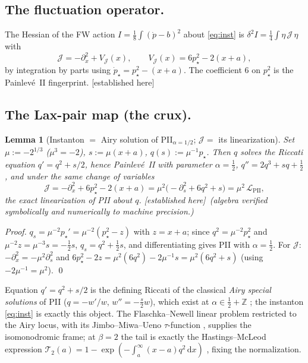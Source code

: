 \documentclass[11pt,reqno]{amsart}
\theoremstyle{plain}
\newtheorem{lemma}[theorem]{Lemma}
\theoremstyle{definition}
\theoremstyle{remark}
\newcommand{\dd}{\,\mathrm{d}}
\newcommand{\Z}{\mathbb{Z}}
\newcommand{\pinst}{p_\star}
\newcommand{\tagPr}{{\footnotesize\textsf{[established here]}}}
\begin{document}
\subsection{The fluctuation operator.}
The Hessian of the FW action $I=\tfrac18\int(\dot p-b)^2$ about \eqref{eq:inst} is
$\delta^2 I=\tfrac14\int\eta\,\mathcal J\,\eta$ with
\begin{equation}\label{eq:jacobi}
\mathcal J=-\partial_x^2+V_{\mathcal J}(x),\qquad V_{\mathcal J}(x)=6\pinst^2-2(x+a),
\end{equation}
by integration by parts using $\dot\pinst=\pinst^2-(x+a)$. The coefficient $6$ on $\pinst^2$ is the
Painlev\'e~II fingerprint. \tagPr

\subsection{The Lax-pair map (the crux).}
\begin{lemma}[Instanton $=$ Airy solution of PII${}_{\alpha=1/2}$; $\mathcal J=$ its linearization]
\label{lem:lax}
Set $\mu:=-2^{1/3}$ ($\mu^3=-2$), $s:=\mu(x+a)$, $q(s):=\mu^{-1}\pinst$. Then $q$ solves the Riccati
equation $q'=q^2+s/2$, hence Painlev\'e~II with parameter $\alpha=\tfrac12$, $q''=2q^3+sq+\tfrac12$,
and under the same change of variables
\[
\mathcal J=-\partial_x^2+6\pinst^2-2(x+a)=\mu^2\bigl(-\partial_s^2+6q^2+s\bigr)=\mu^2\,\mathcal L_{\mathrm{PII}},
\]
the exact linearization of PII about $q$. \tagPr\ \emph{(algebra verified symbolically and numerically
to machine precision.)}
\end{lemma}
\begin{proof}
$q_s=\mu^{-2}\pinst'=\mu^{-2}(\pinst^2-z)$ with $z=x+a$; since $q^2=\mu^{-2}\pinst^2$ and
$\mu^{-2}z=\mu^{-3}s=-\tfrac12 s$, $q_s=q^2+\tfrac12 s$, and differentiating gives PII with
$\alpha=\tfrac12$. For $\mathcal J$: $-\partial_x^2=-\mu^2\partial_s^2$ and
$6\pinst^2-2z=\mu^2(6q^2)-2\mu^{-1}s=\mu^2(6q^2+s)$ (using $-2\mu^{-1}=\mu^2$). \qed
\end{proof}
Equation $q'=q^2+s/2$ is the defining Riccati of the classical \emph{Airy special solutions} of PII
($q=-w'/w$, $w''=-\tfrac{s}{2}w$), which exist at $\alpha\in\tfrac12+\Z$ \cite{FIKN,Clarkson}; the
instanton \eqref{eq:inst} is exactly this object. The Flaschka--Newell linear problem \cite{FN1980}
restricted to the Airy locus, with its Jimbo--Miwa--Ueno $\tau$-function \cite{JMU1981}, supplies the
isomonodromic frame; at $\beta=2$ the tail is exactly the Hastings--McLeod expression
$\mathcal T_2(a)=1-\exp(-\int_a^\infty(x-a)q^2\dd x)$ \cite{TW1994}, fixing the normalization.
\end{document}
